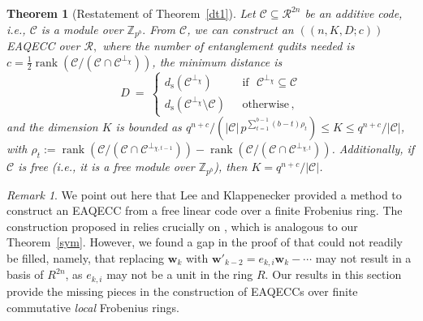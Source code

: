 \documentclass{article}
\DeclareMathOperator{\rank}{rank}
\newtheorem{thm}{Theorem}[section]
\theoremstyle{remark}
\newtheorem{rem}{Remark}[section]
\theoremstyle{definition}
\numberwithin{equation}{section}
\begin{document}
\begin{thm}[Restatement of Theorem~\ref{dt1}]  Let $\mathcal{C} \subseteq \mathcal{R}^{2n}$ be an additive code,  i.e.,  $\mathcal{C}$ is a module over $\mathbb{Z}_{p^b}.$  From $\mathcal{C}$, we can construct an $((n,K, D; c))$ EAQECC over $\mathcal{R},$ where the number of entanglement qudits needed is $c = \frac12 \rank(\mathcal{C}/(\mathcal{C} \cap \mathcal{C}^{\perp_{{\chi}}}))$, the minimum distance is
\begin{equation*}
D~=~\left\{\begin{array}{ll}
d_{\mathrm{s}}(\mathcal{C}^{\perp_\chi}) & \text{~~if~~} \mathcal{C}^{\perp_\chi} \subseteq \mathcal{C} \\
d_{\mathrm{s}}(\mathcal{C}^{\perp_\chi}\setminus \mathcal{C}) & \text{~~otherwise} \, ,
\end{array}\right. 
\end{equation*}
and the dimension $K$ is bounded as $q^{n+c}/ (|\mathcal{C}| \, {p^{\sum_{t=1}^{b-1} (b-t)\rho_t}}) \leq  K \leq q^{n+c}/|\mathcal{C}|$, with $\rho_t:=\rank(\mathcal{C}/(\mathcal{C} \cap \mathcal{C}^{\perp_{\chi,t-1}}))-\rank(\mathcal{C}/(\mathcal{C} \cap \mathcal{C}^{\perp_{\chi,t}}))$. Additionally, if $\mathcal{C}$ is free (i.e., it is a free module over $\mathbb{Z}_{p^b}$), then $K = q^{n+c}/|\mathcal{C}|$.
\end{thm}
 
\begin{rem}  We point out here that Lee and Klappenecker \cite[Proposition 2]{lee} provided a method to construct an EAQECC from a free linear code over a finite Frobenius ring. The construction proposed in \cite[Proposition 2]{lee} relies crucially on \cite[Theorem 5]{lee}, which is analogous to our Theorem~\ref{sym}. However, we found a gap in the proof of \cite[Theorem 5]{lee} that could not readily be filled, namely, that replacing $\mathbf{w}_k$ with $\mathbf{w}'_{k-2} = e_{k,i} \mathbf{w}_k - \cdots $ may not result in a basis of $R^{2n}$, as $e_{k,i}$ may not be a unit in the ring $R.$ Our results in this section provide the missing pieces in the construction of EAQECCs over finite commutative \emph{local} Frobenius rings.\end{rem}
\end{document}
